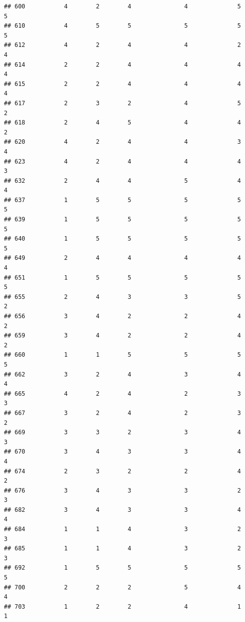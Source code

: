 \documentclass[
]{article}
\begin{document}
\begin{verbatim}
## 600           4        2        4               4              5             5
## 610           4        5        5               5              5             5
## 612           4        2        4               4              2             4
## 614           2        2        4               4              4             4
## 615           2        2        4               4              4             4
## 617           2        3        2               4              5             2
## 618           2        4        5               4              4             2
## 620           4        2        4               4              3             4
## 623           4        2        4               4              4             3
## 632           2        4        4               5              4             4
## 637           1        5        5               5              5             5
## 639           1        5        5               5              5             5
## 640           1        5        5               5              5             5
## 649           2        4        4               4              4             4
## 651           1        5        5               5              5             5
## 655           2        4        3               3              5             2
## 656           3        4        2               2              4             2
## 659           3        4        2               2              4             2
## 660           1        1        5               5              5             5
## 662           3        2        4               3              4             4
## 665           4        2        4               2              3             3
## 667           3        2        4               2              3             2
## 669           3        3        2               3              4             3
## 670           3        4        3               3              4             4
## 674           2        3        2               2              4             2
## 676           3        4        3               3              2             3
## 682           3        4        3               3              4             4
## 684           1        1        4               3              2             3
## 685           1        1        4               3              2             3
## 692           1        5        5               5              5             5
## 700           2        2        2               5              4             4
## 703           1        2        2               4              1             1

\end{verbatim}
\end{document}
